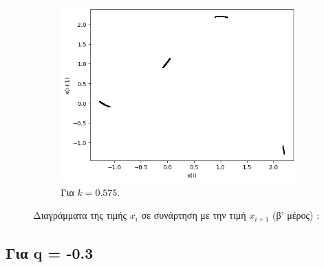 \begin{figure}[h!]
\begin{subfigure}[c]{0.4\textwidth}
		\includegraphics[width=\textwidth]{LateX images/graphs/k0575}
		\caption{Για $k=0.575$.}
		\label{f:k14}
	\end{subfigure}
\caption{Διαγράμματα της τιμής \(x_i\) σε συνάρτηση με την τιμή \(x_{i+1}\) (β' μέρος) :}
\end{figure}
\vfill
\clearpage
\newpage
\subsection{Για q = -0.3}

